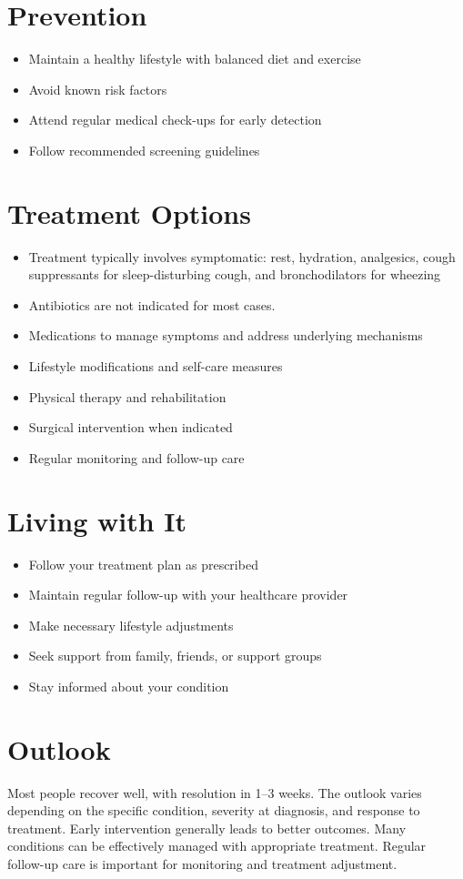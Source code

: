 \section{Prevention}
\begin{itemize}[noitemsep]
  \item Maintain a healthy lifestyle with balanced diet and exercise
  \item Avoid known risk factors
  \item Attend regular medical check-ups for early detection
  \item Follow recommended screening guidelines
\end{itemize}
\section{Treatment Options}
\begin{itemize}[noitemsep]
  \item Treatment typically involves symptomatic: rest, hydration, analgesics, cough suppressants for sleep-disturbing cough, and bronchodilators for wheezing
  \item Antibiotics are not indicated for most cases.
  \item Medications to manage symptoms and address underlying mechanisms
  \item Lifestyle modifications and self-care measures
  \item Physical therapy and rehabilitation
  \item Surgical intervention when indicated
  \item Regular monitoring and follow-up care
\end{itemize}
\section{Living with It}
\begin{itemize}[noitemsep]
  \item Follow your treatment plan as prescribed
  \item Maintain regular follow-up with your healthcare provider
  \item Make necessary lifestyle adjustments
  \item Seek support from family, friends, or support groups
  \item Stay informed about your condition
\end{itemize}
\section{Outlook}
Most people recover well, with resolution in 1--3 weeks. The outlook varies depending on the specific condition, severity at diagnosis, and response to treatment. Early intervention generally leads to better outcomes. Many conditions can be effectively managed with appropriate treatment. Regular follow-up care is important for monitoring and treatment adjustment.

